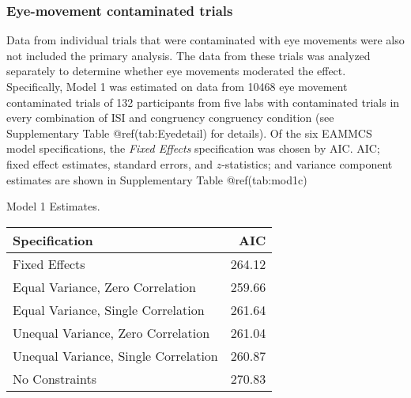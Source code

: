 \begin{appendix}
\subsubsection{Eye-movement contaminated
trials}\label{eye-movement-contaminated-trials}

Data from individual trials that were contaminated with eye movements
were also not included the primary analysis. The data from these trials
was analyzed separately to determine whether eye movements moderated the
effect. Specifically, Model 1 was estimated on data from 10468 eye
movement contaminated trials of 132 participants from five labs with
contaminated trials in every combination of ISI and congruency
congruency condition (see Supplementary Table @ref(tab:Eyedetail) for
details). Of the six EAMMCS model specifications, the \emph{Fixed
Effects} specification was chosen by AIC. AIC; fixed effect estimates,
standard errors, and \(z\)-statistics; and variance component estimates
are shown in Supplementary Table @ref(tab:mod1c)

\begin{table}[!p]
\caption{\label{tab:mod1}Model 1 Estimates.}
\begin{subtable}{\textwidth}
\centering
\begin{table}[H]\centering\begingroup\fontsize{10}{12}\selectfont

\begin{tabular}{lr}
\toprule
Specification & AIC\\
\midrule
Fixed Effects & 264.12\\
Equal Variance, Zero Correlation & 259.66\\
Equal Variance, Single Correlation & 261.64\\
Unequal Variance, Zero Correlation & 261.04\\
Unequal Variance, Single Correlation & 260.87\\
No Constraints & 270.83\\
\bottomrule
\end{tabular}\endgroup{}
\end{table}
\end{subtable}
\begin{subtable}{\textwidth}
\caption{Fixed Effect Estimates}
\centering
\begin{table}[H]\centering\begingroup\fontsize{10}{12}\selectfont


\end{table}
\end{subtable}
\end{table}
\end{appendix}
